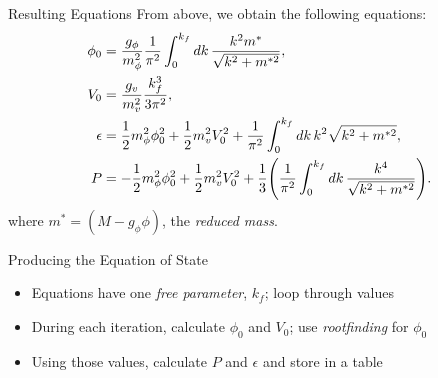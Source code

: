 \documentclass[]{beamer}
\begin{document}
    \begin{frame}{Resulting Equations}
        From above, we obtain the following equations: \pause
        \begin{align*}
            \phi_0 &= \frac{g_\phi}{m_\phi^2} \frac{1}{\pi^2}\int_0^{k_f} \dd{k} \frac{k^2 m^*}{\sqrt{k^2 + m^{*2}}},  \\
            V_0 &= \frac{g_v}{m_v^2} \frac{k_f^3}{3\pi^2}, \\
            \epsilon & = \frac{1}{2} m_\phi^2 \phi_0^2 + \frac{1}{2} m_v^2 V_0^2 + \frac{1}{\pi^2} \int_0^{k_f} \dd{k} k^2 \sqrt{k^2 + m^{*2}},\\
            P & = -\frac{1}{2} m_\phi^2 \phi_0^2 + \frac{1}{2} m_v^2 V_0^2 + \frac{1}{3} \pqty{\frac{1}{\pi^2} \int_0^{k_f} \dd{k}\frac{k^4}{\sqrt{k^2 + m^{*2}}}}.
        \end{align*}
        where $m^* = (M-g_\phi \phi)$, the \textit{reduced mass}.
    \end{frame}

    \begin{frame}{Producing the Equation of State}
        \begin{itemize}
            \item Equations have one \textit{free parameter}, $k_f$\pause ; loop through values\pause
            \item During each iteration, calculate $\phi_0$ and $V_0$\pause; use \textit{rootfinding} for $\phi_0$\pause
            \item Using those values, calculate $P$ and $\epsilon$ and store in a table
        \end{itemize}
    \end{frame}
    
\end{document}
